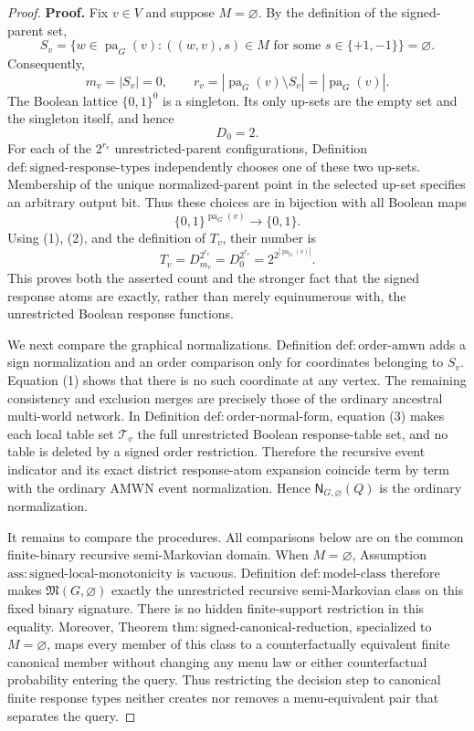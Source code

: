 \documentclass{article}
\begin{document}
\begin{proof}
\textbf{Proof.}
Fix \(v\in V\) and suppose \(M=\varnothing\).  By the definition of the signed-parent set,
\[
 S_v
 =\{w\in\operatorname{pa}_G(v):((w,v),s)\in M
       \text{ for some }s\in\{+1,-1\}\}
 =\varnothing.
\]
Consequently,
\[
 m_v=|S_v|=0,
 \qquad
 r_v=|\operatorname{pa}_G(v)\setminus S_v|
     =|\operatorname{pa}_G(v)|.
\tag{1}
\]
The Boolean lattice \(\{0,1\}^{0}\) is a singleton.  Its only up-sets are the empty set and the singleton itself, and hence
\[
 D_0=2.
\tag{2}
\]
For each of the \(2^{r_v}\) unrestricted-parent configurations, Definition \(\mathrm{def:signed\text{-}response\text{-}types}\) independently chooses one of these two up-sets.  Membership of the unique normalized-parent point in the selected up-set specifies an arbitrary output bit.  Thus these choices are in bijection with all Boolean maps
\[
 \{0,1\}^{\operatorname{pa}_G(v)}\longrightarrow\{0,1\}.
\]
Using (1), (2), and the definition of \(T_v\), their number is
\[
 T_v
 =D_{m_v}^{2^{r_v}}
 =D_0^{2^{r_v}}
 =2^{2^{|\operatorname{pa}_G(v)|}}.
\tag{3}
\]
This proves both the asserted count and the stronger fact that the signed response atoms are exactly, rather than merely equinumerous with, the unrestricted Boolean response functions.

We next compare the graphical normalizations.  Definition \(\mathrm{def:order\text{-}amwn}\) adds a sign normalization and an order comparison only for coordinates belonging to \(S_v\).  Equation (1) shows that there is no such coordinate at any vertex.  The remaining consistency and exclusion merges are precisely those of the ordinary ancestral multi-world network.  In Definition \(\mathrm{def:order\text{-}normal\text{-}form}\), equation (3) makes each local table set \(\mathcal T_v\) the full unrestricted Boolean response-table set, and no table is deleted by a signed order restriction.  Therefore the recursive event indicator and its exact district response-atom expansion coincide term by term with the ordinary AMWN event normalization.  Hence \(\mathsf N_{G,\varnothing}(Q)\) is the ordinary normalization.

It remains to compare the procedures.  All comparisons below are on the common finite-binary recursive semi-Markovian domain.  When \(M=\varnothing\), Assumption \(\mathrm{ass:signed\text{-}local\text{-}monotonicity}\) is vacuous.  Definition \(\mathrm{def:model\text{-}class}\) therefore makes \(\mathfrak M(G,\varnothing)\) exactly the unrestricted recursive semi-Markovian class on this fixed binary signature.  There is no hidden finite-support restriction in this equality.  Moreover, Theorem \(\mathrm{thm:signed\text{-}canonical\text{-}reduction}\), specialized to \(M=\varnothing\), maps every member of this class to a counterfactually equivalent finite canonical member without changing any menu law or either counterfactual probability entering the query.  Thus restricting the decision step to canonical finite response types neither creates nor removes a menu-equivalent pair that separates the query.


\end{proof}
\end{document}
